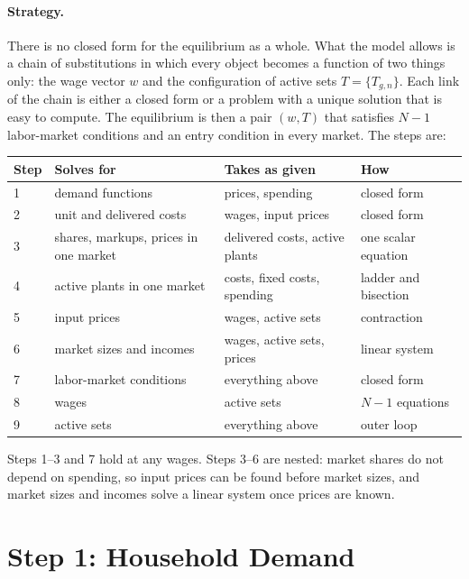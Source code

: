 \documentclass[11pt]{article}
\theoremstyle{remark}
\begin{document}
\paragraph{Strategy.} There is no closed form for the equilibrium as a whole. What
the model allows is a chain of substitutions in which every object becomes a function
of two things only: the wage vector $w$ and the configuration of active sets
$T=\{T_{g,n}\}$. Each link of the chain is either a closed form or a problem with a
unique solution that is easy to compute. The equilibrium is then a pair $(w,T)$ that
satisfies $N-1$ labor-market conditions and an entry condition in every market. The
steps are:

\begin{center}
\small
\begin{tabular}{@{}llll@{}}
\toprule
Step & Solves for & Takes as given & How \\
\midrule
1 & demand functions & prices, spending & closed form \\
2 & unit and delivered costs & wages, input prices & closed form \\
3 & shares, markups, prices in one market & delivered costs, active plants & one scalar equation \\
4 & active plants in one market & costs, fixed costs, spending & ladder and bisection \\
5 & input prices & wages, active sets & contraction \\
6 & market sizes and incomes & wages, active sets, prices & linear system \\
7 & labor-market conditions & everything above & closed form \\
8 & wages & active sets & $N-1$ equations \\
9 & active sets & everything above & outer loop \\
\bottomrule
\end{tabular}
\end{center}

\noindent Steps 1--3 and 7 hold at any wages. Steps 3--6 are nested: market shares do
not depend on spending, so input prices can be found before market sizes, and market
sizes and incomes solve a linear system once prices are known.

\section{Step 1: Household Demand}
\label{sec:demand}
\end{document}
